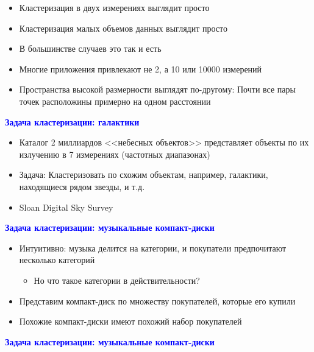 \documentclass[landscape]{slides}
\begin{document}
\begin{normalsize}
\begin{slide}
\begin{itemize}
\item Кластеризация в двух измерениях выглядит просто
\item Кластеризация малых объемов данных выглядит просто
\item В большинстве случаев это так и есть
\item Многие приложения привлекают не 2, а 10 или 10000 измерений
\item Пространства высокой размерности выглядят по-другому:
Почти все пары точек расположины примерно на одном расстоянии
\end{itemize}
\end{slide}



\begin{slide}
\textbf{\textcolor{blue}{Задача кластеризации: галактики}}

\begin{itemize}
\item Каталог 2 миллиардов <<небесных объектов>> представляет объекты по их излучению в 7 измерениях (частотных диапазонах)
\item Задача: Кластеризовать по схожим объектам, например, галактики, находящиеся рядом звезды, и т.д.
\item Sloan Digital Sky Survey
\end{itemize}
\end{slide}



\begin{slide}
\textbf{\textcolor{blue}{Задача кластеризации: музыкальные компакт-диски}}

\begin{itemize}
\item Интуитивно: музыка делится на категории, и покупатели предпочитают несколько категорий
  \begin{itemize}
  \item Но что такое категории в действительности?
  \end{itemize}
\item Представим компакт-диск по множеству покупателей, которые его купили
\item Похожие компакт-диски имеют похожий набор покупателей
\end{itemize}
\end{slide}



\begin{slide}
\textbf{\textcolor{blue}{Задача кластеризации: музыкальные компакт-диски}}


\end{slide}
\end{normalsize}
\end{document}
